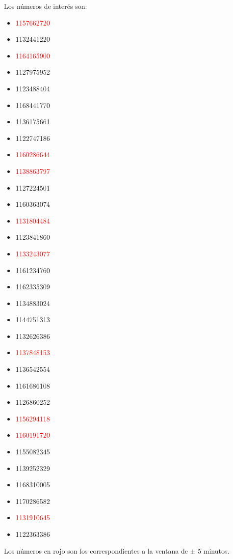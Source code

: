 \documentclass[12pt]{report}
\begin{document}
	Los números  de interés son:
	\begin{itemize}
		\item \textcolor{red}{1157662720}
		\item 1132441220
		\item \textcolor{red}{1164165900}
		\item 1127975952
		\item 1123488404
		\item 1168441770
		\item 1136175661
		\item 1122747186
		\item \textcolor{red}{1160286644}
		\item \textcolor{red}{1138863797}
		\item 1127224501
		\item 1160363074
		\item \textcolor{red}{1131804484}
		\item 1123841860
		\item \textcolor{red}{1133243077}
		\item 1161234760
		\item 1162335309
		\item 1134883024
		\item 1144751313
		\item 1132626386
		\item \textcolor{red}{1137848153}
		\item 1136542554
		\item 1161686108
		\item 1126860252
		\item \textcolor{red}{1156294118}
		\item \textcolor{red}{1160191720}
		\item 1155082345
		\item 1139252329
		\item 1168310005
		\item 1170286582
		\item \textcolor{red}{1131910645}
		\item 1122363386
	\end{itemize}
	
	Los números en rojo son los correspondientes a la ventana de $\pm$ 5 minutos.
\end{document}

